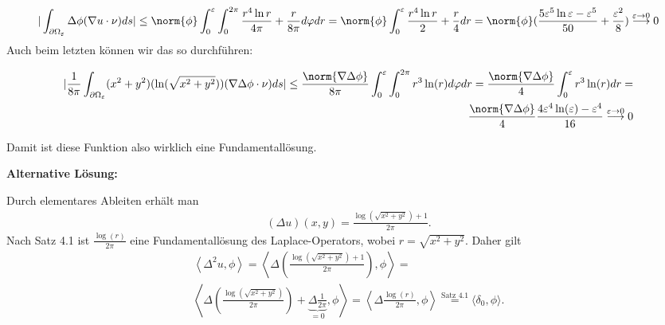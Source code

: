 \begin{solution}
\begin{align*}
  |\int_{\partial \Omega_\varepsilon} \Delta \phi (\nabla u \cdot \nu) ds|
  \leq
  \norm{\phi}  \int_0^\varepsilon \int_0^{2 \pi} \frac{r^4\ln{r}}{4\pi} + \frac{r}{8\pi} d\varphi dr
  =
  \norm{\phi} \int_0^\varepsilon \frac{r^4\ln{r}}{2} + \frac{r}{4} dr
  =
  \norm{\phi}(\frac{5\varepsilon^5 \ln{\varepsilon} - \varepsilon^5}{50} + \frac{\varepsilon^2}{8})
  \stackrel{\varepsilon \rightarrow 0}{\longrightarrow}
  0
\end{align*}
Auch beim letzten können wir das so durchführen:

\begin{align*}
  |\frac{1}{8\pi} \int_{\partial \Omega_\varepsilon} (x^2 + y^2)(\ln(\sqrt{x^2 + y^2})) (\nabla \Delta \phi \cdot \nu) ds|
  \leq
  \frac{\norm{\nabla \Delta \phi}}{8 \pi} \int_0^\varepsilon \int_0^{2 \pi} r^3 \ln(r) d\varphi dr
  =
  \frac{\norm{\nabla \Delta \phi}}{4} \int_0^\varepsilon r^3 \ln(r) dr
  =\\
  \frac{\norm{\nabla \Delta \phi}}{4} \frac{4 \varepsilon^4 \ln(\varepsilon) - \varepsilon^4 }{16}
  \stackrel{\varepsilon \rightarrow 0}{\longrightarrow}
  0
\end{align*}

Damit ist diese Funktion also wirklich eine Fundamentallösung.

\textbf{Alternative Lösung:}

Durch elementares Ableiten erhält man
\begin{align}
    (\Delta u)(x, y) = \frac{\log(\sqrt{x^2 + y^2}) + 1}{2 \pi}.
\end{align}
Nach Satz 4.1 ist $\frac{\log(r)}{2 \pi}$ eine Fundamentallösung des Laplace-Operators, wobei $r = \sqrt{x^2 + y^2}$. Daher gilt
\begin{align}
    \left\langle \Delta^2 u, \phi \right\rangle =  \left\langle \Delta \left( \frac{\log(\sqrt{x^2 + y^2}) + 1}{2 \pi}\right), \phi \right\rangle
    = \\ \left\langle \Delta \left( \frac{\log(\sqrt{x^2 + y^2})}{2 \pi}\right) + \underbrace{\Delta \frac{1}{2 \pi}}_{= 0}, \phi \right\rangle =
    \left\langle \Delta \frac{\log(r)}{2 \pi}, \phi \right\rangle \stackrel{\text{Satz 4.1}}= \langle \delta_0, \phi \rangle.
\end{align}
\end{solution}

